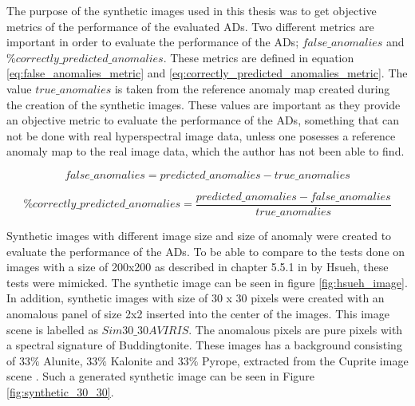 The purpose of the synthetic images used in this thesis was to get objective metrics of the performance of the evaluated ADs. Two different metrics are important in order to evaluate the performance of the ADs; $false\_anomalies$ and $\%correctly\_predicted\_anomalies$. These metrics are defined in equation \ref{eq:false_anomalies_metric} and \ref{eq:correctly_predicted_anomalies_metric}. The value $true\_anomalies$ is taken from the reference anomaly map created during the creation of the synthetic images. These values are important as they provide an objective metric to evaluate the performance of the ADs, something that can not be done with real hyperspectral image data, unless one posesses a reference anomaly map to the real image data, which the author has not been able to find.  

\begin{equation}
    false\_anomalies = predicted\_anomalies - true\_anomalies
    \label{eq:false_anomalies_metric}
\end{equation}


\begin{equation}
    \%correctly\_predicted\_anomalies= \frac{predicted\_anomalies-false\_anomalies}{true\_anomalies}
    \label{eq:correctly_predicted_anomalies_metric}
\end{equation}

Synthetic images with different image size and size of anomaly were created to evaluate the performance of the ADs. To be able to compare to the tests done on images with a size of 200x200 as described in chapter 5.5.1 in \cite{hsueh_master_thesis} by Hsueh, these tests were mimicked. The synthetic image can be seen in figure \ref{fig:hsueh_image}. In addition, synthetic images with size of 30 x 30 pixels were created with an anomalous panel of size 2x2 inserted into the center of the images. This image scene is labelled as $Sim30\_30AVIRIS$. The anomalous pixels are pure pixels with a spectral signature of Buddingtonite. These images has a background consisting of $33\%$ Alunite, $33\%$ Kalonite and $33\%$ Pyrope, extracted from the Cuprite image scene \cite{ground_truth_cuprite}. Such a generated synthetic image can be seen in Figure \ref{fig:synthetic_30_30}.


